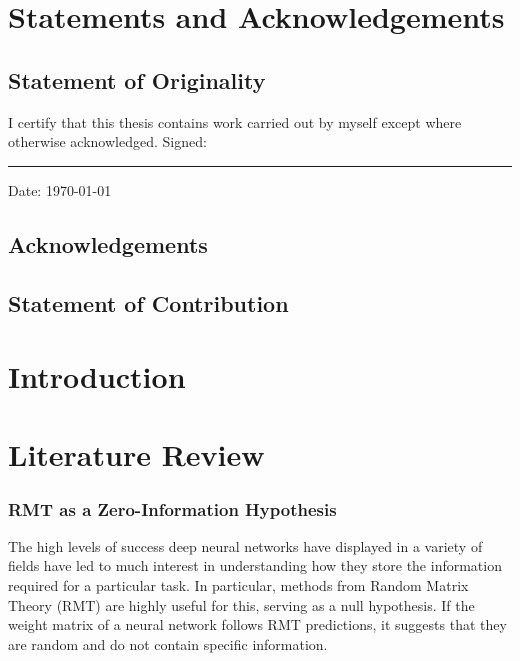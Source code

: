 \documentclass[11pt,oneside]{report}
\begin{document}
\chapter*{Statements and Acknowledgements}

\section*{Statement of Originality}
I certify that this thesis contains work carried out by myself except where otherwise acknowledged.
\vspace{0.5cm}
\noindent Signed: \rule{4cm}{0.4pt} \hfill Date: \today

\section*{Acknowledgements}
\lipsum[2]

\section*{Statement of Contribution}
\lipsum[3]

\clearpage
{}
\tableofcontents
\clearpage


\chapter{Introduction}
\label{chap:intro}
\lipsum[4-6]

\chapter{Literature Review}
\label{chap:review}
\subsection{RMT as a Zero-Information Hypothesis}
The high levels of success deep neural networks have displayed in a variety of fields have led to much interest in understanding how they store the information required for a particular task. In particular, methods from Random Matrix Theory (RMT) are highly useful for this, serving as a null hypothesis. If the weight matrix of a neural network follows RMT predictions, it suggests that they are random and do not contain specific information.
\end{document}

